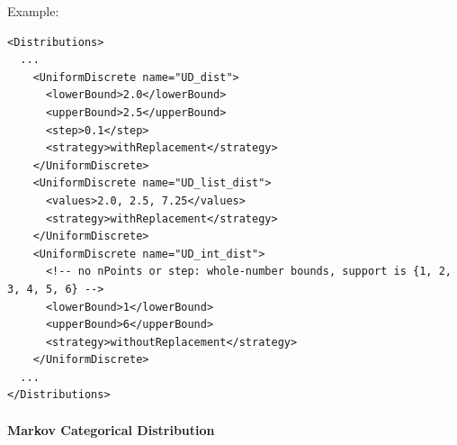 Example:
\begin{lstlisting}[style=XML]
<Distributions>
  ...
    <UniformDiscrete name="UD_dist">
      <lowerBound>2.0</lowerBound>
      <upperBound>2.5</upperBound>
      <step>0.1</step>
      <strategy>withReplacement</strategy>
    </UniformDiscrete>
    <UniformDiscrete name="UD_list_dist">
      <values>2.0, 2.5, 7.25</values>
      <strategy>withReplacement</strategy>
    </UniformDiscrete>
    <UniformDiscrete name="UD_int_dist">
      <!-- no nPoints or step: whole-number bounds, support is {1, 2, 3, 4, 5, 6} -->
      <lowerBound>1</lowerBound>
      <upperBound>6</upperBound>
      <strategy>withoutReplacement</strategy>
    </UniformDiscrete>
  ...
</Distributions>
\end{lstlisting}

\paragraph{Markov Categorical Distribution}
\label{subsec:markovCategorical}

